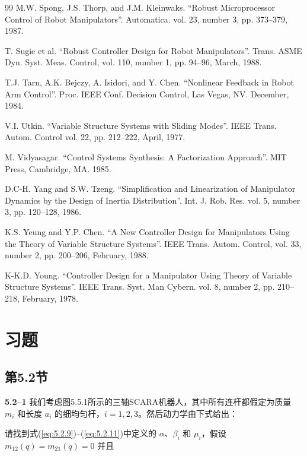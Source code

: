 \documentclass[UTF8,12pt,a4paper]{ctexart}
\begin{document}
\begin{thebibliography}{99}
M.W. Spong, J.S. Thorp, and J.M. Kleinwaks.
``Robust Microprocessor Control of Robot Manipulators''. Automatica. vol. 23, number 3, pp. 373--379, 1987.

T. Sugie et al.
``Robust Controller Design for Robot Manipulators''. Trans. ASME Dyn. Syst. Meas. Control, vol. 110, number 1, pp. 94--96, March, 1988.

T.J. Tarn, A.K. Bejczy, A. Isidori, and Y. Chen.
``Nonlinear Feedback in Robot Arm Control''. Proc. IEEE Conf. Decision Control, Las Vegas, NV. December, 1984.

V.I. Utkin.
``Variable Structure Systems with Sliding Modes''. IEEE Trans. Autom. Control vol. 22, pp. 212--222, April, 1977.

M. Vidyasagar.
``Control Systems Synthesis: A Factorization Approach''. MIT Press, Cambridge, MA. 1985.

D.C-H. Yang and S.W. Tzeng.
``Simplification and Linearization of Manipulator Dynamics by the Design of Inertia Distribution''. Int. J. Rob. Res. vol. 5, number 3, pp. 120--128, 1986.

K.S. Yeung and Y.P. Chen.
``A New Controller Design for Manipulators Using the Theory of Variable Structure Systems''. IEEE Trans. Autom. Control, vol. 33, number 2, pp. 200--206, February, 1988.

K-K.D. Young.
``Controller Design for a Manipulator Using Theory of Variable Structure Systems''. IEEE Trans. Syst. Man Cybern. vol. 8, number 2, pp. 210--218, February, 1978.

\end{thebibliography}

\section*{习题}

\subsection*{第5.2节}

\textbf{5.2--1} 我们考虑图5.5.1所示的三轴SCARA机器人，其中所有连杆都假定为质量 $m_i$ 和长度 $a_i$ 的细均匀杆，$i = 1, 2, 3$。然后动力学由下式给出：

请找到式(\ref{eq:5.2.9})--(\ref{eq:5.2.11})中定义的 $\alpha$、$\beta_i$ 和 $\mu_i$，假设 $m_{12}(q) = m_{21}(q) = 0$ 并且
\end{document}

